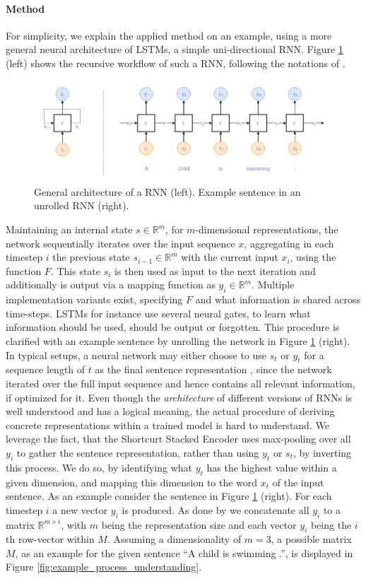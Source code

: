\paragraph*{Method}\label{sec:understanding1_method}
For simplicity, we explain the applied method on an example, using a more general neural architecture of \ac{LSTM}s, a simple uni-directional \ac{RNN}.
Figure \ref{fig:rnn} (left) shows the recursive workflow of such a \ac{RNN}, following the notations of \cite{goldberg2017Apr}.
\begin{figure}[tph!]
\centering
	\includegraphics[totalheight=5.5cm]{fig/rnn.png}
	\caption{General architecture of a \ac{RNN} (left). Example sentence in an unrolled \ac{RNN} (right).}
	\label{fig:rnn}
\end{figure}
Maintaining an internal state $s \in \mathbb{R}^m$, for $m$-dimensional representations, the network sequentially iterates over the input sequence $x$, aggregating in each timestep $i$ the previous state $s_{i-1} \in \mathbb{R}^m$ with the current input $x_i$, using the function $F$. This state $s_i$ is then used as input to the next iteration and additionally is output via a mapping function as $y_i \in \mathbb{R}^m$. Multiple implementation variants exist, specifying $F$ and what information is shared across time-steps. \ac{LSTM}s for instance use several neural gates, to learn what information should be used, should be output or forgotten. This procedure is clarified with an example sentence by unrolling the network in Figure \ref{fig:rnn} (right). In typical setups, a neural network may either choose to use $s_t$ or $y_t$ for a sequence length of $t$ as the final sentence representation \citep{goldberg2017Apr}, since the network iterated over the full input sequence and hence contains all relevant information, if optimized for it. Even though the \textit{architecture} of different versions of \ac{RNN}s is well understood and has a logical meaning, the actual procedure of deriving concrete representations within a trained model is hard to understand. We leverage the fact, that the Shortcurt Stacked Encoder uses max-pooling over all $y_i$ to gather the sentence representation, rather than using $y_t$ or $s_t$, by inverting this process. We do so, by identifying what $y_t$ has the highest value within a given dimension, and mapping this dimension to the word $x_t$ of the input sentence. As an example consider the sentence in Figure \ref{fig:rnn} (right). For each timestep $i$ a new vector $y_i$ is produced. As done by \cite{nie2017shortcut} we concatenate all $y_i$ to a matrix $\mathbb{R}^{m \times i}$, with $m$ being the representation size and each vector $y_i$ being the $i$th row-vector within $M$. Assuming a dimensionality of $m = 3$, a possible matrix $M$, as an example for the given sentence ``A child is swimming .'', is displayed in Figure \ref{fig:example_process_understanding}. 

